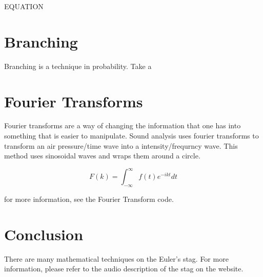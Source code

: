 \documentclass{article}
\begin{document}
EQUATION


\section{Branching}
Branching is a technique in probability. Take a 

\section{Fourier Transforms}
Fourier transforms are a way of changing the information that one has into something that is easier to manipulate. Sound analysis uses fourier transforms to transform an air pressure/time wave into a intensity/frequrncy wave. This method uses sinosoidal waves and wraps them around a circle. 

$$ F(k) = \int_{-\infty}^{\infty} f(t) e^{-ikt} dt 
$$

for more information, see the Fourier Transform code.

\section{Conclusion}
There are many mathematical techniques on the Euler's stag. For more information, please refer to the audio description of the stag on the website.
\end{document}
